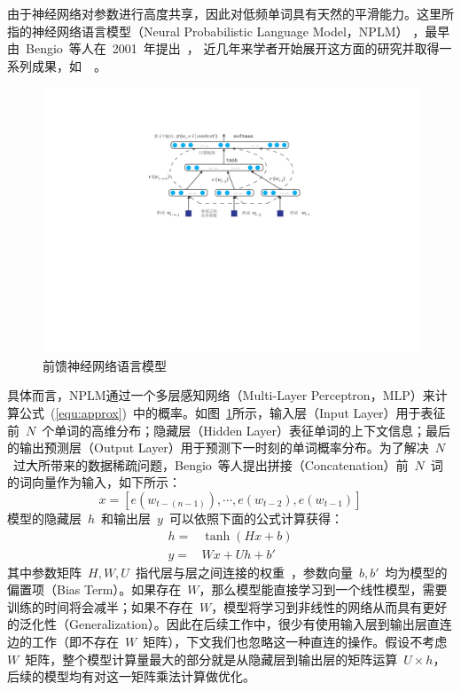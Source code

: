 由于神经网络对参数进行高度共享，因此对低频单词具有天然的平滑能力。这里所指的神经网络语言模型（Neural Probabilistic Language Model，NPLM） ，最早由~Bengio~等人在~2001~年提出~， 近几年来学者开始展开这方面的研究并取得一系列成果，如~\cite{DBLP:conf/acl/BaroniDK14,DBLP:journals/sigkdd/BellK07,DBLP:journals/pami/BengioCV13,DBLP:journals/tnn/BengioSF94}~。
\begin{figure}
  \centering
  \includegraphics[width=.85\linewidth]{./figures/nplm.pdf}
  \caption{前馈神经网络语言模型}\label{fig:nplm}
\end{figure}

具体而言，NPLM通过一个多层感知网络（Multi-Layer Perceptron，MLP）来计算公式~(\ref{equ:approx})~中的概率。如图~\ref{fig:nplm}所示，输入层（Input Layer）用于表征前~$N$~个单词的高维分布；隐藏层（Hidden Layer）表征单词的上下文信息；最后的输出预测层（Output Layer）用于预测下一时刻的单词概率分布。为了解决~$N$~过大所带来的数据稀疏问题，Bengio~等人提出拼接（Concatenation）前~$N$~词的词向量作为输入，如下所示：
\begin{equation}\label{equ:we}
  x = [e(w_{t-(n-1)}), \cdots , e(w_{t-2}), e{(w_{t-1})}]
\end{equation}
模型的隐藏层~$h$~和输出层~$y$~可以依照下面的公式计算获得：
\begin{equation}\label{equ:nplm}
\begin{split}
h =& \tanh(Hx+b) \\
y =&Wx + Uh +b'
\end{split}
\end{equation}
其中参数矩阵~$H,W,U$~指代层与层之间连接的权重~，参数向量~$b,b'$~均为模型的偏置项（Bias Term）。如果存在~$W$，那么模型能直接学习到一个线性模型，需要训练的时间将会减半；如果不存在~$W$，模型将学习到非线性的网络从而具有更好的泛化性（Generalization）。因此在后续工作中，很少有使用输入层到输出层直连边的工作（即不存在~$W$~矩阵），下文我们也忽略这一种直连的操作。假设不考虑~$W$~矩阵，整个模型计算量最大的部分就是从隐藏层到输出层的矩阵运算~$U\times h$，后续的模型均有对这一矩阵乘法计算做优化。

